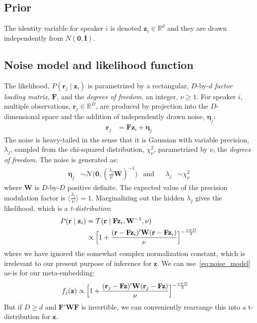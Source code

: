 \documentclass[a4paper,oneside,12pt,english]{report}
\def\zvec{\mathbf{z}}
\def\ND{\mathcal{N}}
\def\expp#1{\bigl\langle#1\bigr\rangle}
\def\R{\mathbb{R}}
\def\Wmat{\mathbf{W}}
\def\Fmat{\mathbf{F}}
\def\Imat{\mathbf{I}}
\def\rvec{\mathbf{r}}
\def\nulvec{\boldsymbol{0}}
\begin{document}
\subsection{Prior}
The identity variable for speaker $i$ is denoted $\zvec_i\in\R^d$ and they are drawn independently from $N(\nulvec,\Imat)$. 

\subsection{Noise model and likelihood function}
\def\etavec{\boldsymbol{\eta}}
\def\TD{\mathcal{T}}
The likelihood, $P(\rvec_j\mid\zvec_i)$ is parametrized by a rectangular, $D$-by-$d$ \emph{factor loading matrix}, $\Fmat$, and the \emph{degrees of freedom}, an integer, $\nu\ge1$. For speaker $i$, multiple observations, $\rvec_j\in\R^D$, are produced by projection into the $D$-dimensional space and the addition of independently drawn noise, $\etavec_j$:
\begin{align}
\rvec_j &= \Fmat\zvec_i + \etavec_j 
\end{align}
The noise is heavy-tailed in the sense that it is Gaussian with variable precision, $\lambda_j$, sampled from the chi-squared distribution, $\chi_\nu^2$, parametrized by $\nu$, the \emph{degrees of freedom}. The noise is generated as:
\begin{align}
\etavec_j&\sim \ND\bigl(\nulvec,(\frac{\lambda_j}{\nu}\Wmat)^{-1}\bigr) &\text{and} && \lambda_j &\sim \chi_\nu^2
\end{align}
where $\Wmat$ is $D$-by-$D$ positive definite. The expected value of the precision modulation factor is $\expp{\frac{\lambda_j}{\nu}}=1$. Marginalizing out the hidden $\lambda_j$ gives the likelihood, which is a \emph{t-distribution}:
\begin{align}
\label{eq:noise_model}
\begin{split}
P(\rvec\mid\zvec_i) &= \TD(\rvec\mid\Fmat\zvec_i,\Wmat^{-1},\nu) \\
&\propto \Bigl[1+\frac{(\rvec-\Fmat\zvec_i)'\Wmat(\rvec-\Fmat\zvec_i)}{\nu}\Bigr]^{-\frac{\nu+D}{2}}
\end{split}
\end{align}
where we have ignored the somewhat complex normalization constant, which is irrelevant to our present purpose of inference for $\zvec$. We can use~\eqref{eq:noise_model} as-is for our meta-embedding: 
\begin{align}
f_j(\zvec) &\propto \Bigl[1+\frac{(\rvec_j-\Fmat\zvec)'\Wmat(\rvec_j-\Fmat\zvec)}{\nu}\Bigr]^{-\frac{\nu+D}{2}}
\end{align}
But if $D\ge d$ and $\Fmat'\Wmat\Fmat$ is invertible, we can conveniently rearrange this into a t-distribution for $\zvec$.
\end{document}
